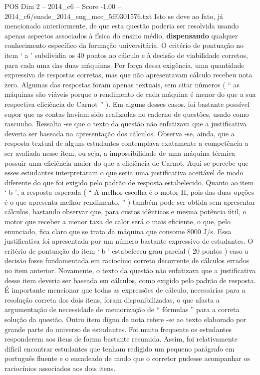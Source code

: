\begin{textsample}{POS Dim 2 – 2014\_c6 – Score -1.00 – 2014\_c6/enade\_2014\_eng\_mec\_5ff0301576.txt}
Isto se deve ao fato, já mencionado anteriormente, de que esta questão poderia ser resolvida usando apenas aspectos associados à física do ensino médio, \textbf{dispensando} qualquer conhecimento específico da formação universitária.
O critério de pontuação no item ‘ a ’ subdividia os 40 pontos ao cálculo e à decisão de viabilidade corretos, para cada uma das duas máquinas.
Por força dessa exigência, uma quantidade expressiva de respostas corretas, mas que não apresentavam cálculo recebeu nota zero.
Algumas das respostas foram apenas textuais, sem citar números ( “ as máquinas são viáveis porque o rendimento de cada máquina é menor do que a sua respectiva eficiência de Carnot ” ).
Em alguns desses casos, foi bastante possível supor que as contas haviam sido realizadas no caderno de questões, usado como rascunho.
Ressalta -se que o texto da questão não enfatizava que a justificativa deveria ser baseada na apresentação dos cálculos.
Observa -se, ainda, que a resposta textual de alguns estudantes contemplava exatamente a competência a ser avaliada nesse item, ou seja, a impossibilidade de uma máquina térmica possuir uma eficiência maior do que a eficiência de Carnot.
Aqui se percebe que esses estudantes interpretaram o que seria uma justificativa aceitável de modo diferente do que foi exigido pelo padrão de resposta estabelecido.
Quanto ao item ‘ b ’, a resposta esperada ( “ A melhor escolha é o motor II, pois das duas opções é o que apresenta melhor rendimento. ” ) também pode ser obtida sem apresentar cálculos, bastando observar que, para custos idênticos e mesma potência útil, o motor que receber a menor taxa de calor será o mais eficiente, o que, pelo enunciado, fica claro que se trata da máquina que consome 8000 J/s.
Essa justificativa foi apresentada por um número bastante expressivo de estudantes.
O critério de pontuação do item ‘ b ’ estabeleceu grau parcial ( 20 pontos ) caso a decisão fosse fundamentada em raciocínio correto decorrente de cálculos errados no item anterior.
Novamente, o texto da questão não enfatizava que a justificativa desse item deveria ser baseada em cálculos, como exigido pelo padrão de resposta.
É importante mencionar que todas as expressões de cálculo, necessárias para a resolução correta dos dois itens, foram disponibilizadas, o que afasta a argumentação de necessidade de memorização de “ fórmulas ” para a correta solução da questão.
Outro item digno de nota refere -se ao texto elaborado por grande parte do universo de estudantes.
Foi muito frequente os estudantes responderem aos itens de forma bastante resumida.
Assim, foi relativamente difícil encontrar estudantes que tenham redigido um pequeno parágrafo em português fluente e o encadeado de modo que o corretor pudesse acompanhar os raciocínios associados aos dois itens.

\end{textsample}
